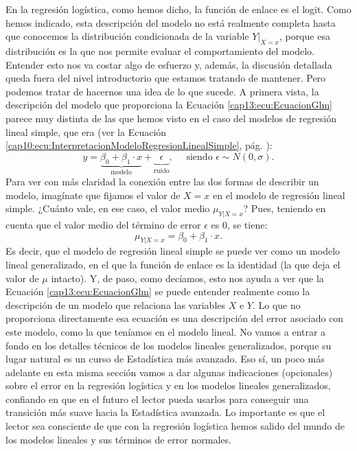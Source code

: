 En la regresión logística, como hemos dicho, la función de enlace es el logit. Como hemos indicado, esta descripción del modelo no está realmente completa hasta que conocemos la distribución condicionada de la variable $Y|_{X=x}$, porque esa distribución es la que nos permite evaluar el comportamiento del modelo. Entender esto nos va costar algo de esfuerzo y, además, la discusión detallada queda fuera del nivel introductorio que estamos tratando de mantener. Pero podemos tratar de hacernos una idea de lo que sucede. A primera vista, la descripción del modelo que proporciona la Ecuación \ref{cap13:ecu:EcuacionGlm} parece muy distinta de las que hemos visto en el caso del modelos de regresión lineal simple, que era (ver la Ecuación \ref{cap10:ecu:InterpretacionModeloRegresionLinealSimple}, pág. \pageref{cap10:ecu:InterpretacionModeloRegresionLinealSimple}):
	\[
	y=
	\underbrace{\beta_0 +\beta_1\cdot x}_{\mbox{modelo}}
	+
	\underbrace{\phantom{\beta}\epsilon\phantom{\beta}}_{\mbox{ruido}},
	\quad\mbox{ siendo }\epsilon\sim N(0,\sigma).
	\]
	Para ver con más claridad la conexión entre las dos formas de describir un modelo, imagínate que fijamos el valor de $X=x$ en el modelo de regresión lineal simple. ¿Cuánto vale, en ese caso, el valor medio $\mu_{Y|X=x}$? Pues, teniendo en cuenta que el valor medio del término de error $\epsilon$ es $0$, se tiene:
	\[
	\mu_{Y|X=x} = \beta_0 +\beta_1\cdot x.
	\]
	Es decir, que el modelo de regresión lineal simple se puede ver como un modelo lineal generalizado, en el que la función de enlace es la identidad (la que deja el valor de $\mu$ intacto). Y, de paso, como decíamos, esto nos ayuda a ver que la Ecuación \ref{cap13:ecu:EcuacionGlm} se puede entender realmente como la descripción de un modelo que relaciona las variables $X$ e $Y$. Lo que no proporciona directamente esa ecuación es una  descripción del error asociado con este modelo, como la que teníamos en el modelo lineal. No vamos a entrar a fondo en los detalles técnicos de los modelos lineales generalizados, porque su lugar natural es un curso de Estadística más avanzado. Eso sí, un poco más adelante en esta misma sección vamos a dar algunas indicaciones (opcionales) sobre el error en la regresión logística y en los modelos lineales generalizados, confiando en que en el futuro el lector pueda usarlos para conseguir una transición más suave hacia la Estadística avanzada.  Lo importante es que el lector sea consciente de que con la regresión logística hemos salido del mundo de los modelos lineales y sus términos de error normales.
	
